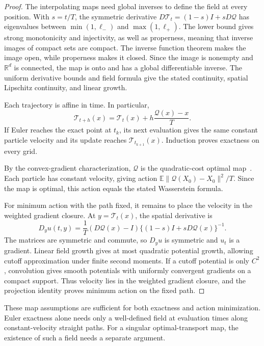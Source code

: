 \begin{proof}
The interpolating maps need global inverses to define the field at every position. With $s=t/T$, the symmetric derivative $D\mathcal T_t=(1-s)I+sD\mathcal Q$ has eigenvalues between $\min(1,\ell_-)$ and $\max(1,\ell_+)$. The lower bound gives strong monotonicity and injectivity, as well as properness, meaning that inverse images of compact sets are compact. The inverse function theorem makes the image open, while properness makes it closed. Since the image is nonempty and $\mathbb R^d$ is connected, the map is onto and has a global differentiable inverse. The uniform derivative bounds and field formula give the stated continuity, spatial Lipschitz continuity, and linear growth.

Each trajectory is affine in time. In particular,
\[
 \mathcal T_{t+h}(x)=\mathcal T_t(x)+h\frac{\mathcal Q(x)-x}{T}.
\]
If Euler reaches the exact point at $t_k$, its next evaluation gives the same constant particle velocity and its update reaches $\mathcal T_{t_{k+1}}(x)$. Induction proves exactness on every grid.

By the convex-gradient characterization, $\mathcal Q$ is the quadratic-cost optimal map~\citep[Section~6.2.3]{ambrosio2005gradient}. Each particle has constant velocity, giving action $\mathbb E\|\mathcal Q(X_0)-X_0\|^2/T$. Since the map is optimal, this action equals the stated Wasserstein formula.

For minimum action with the path fixed, it remains to place the velocity in the weighted gradient closure. At $y=\mathcal T_t(x)$, the spatial derivative is
\[
 D_yu(t,y)=\frac1T(D\mathcal Q(x)-I)
 \{(1-s)I+sD\mathcal Q(x)\}^{-1}.
\]
The matrices are symmetric and commute, so $D_yu$ is symmetric and $u_t$ is a gradient. Linear field growth gives at most quadratic potential growth, allowing cutoff approximation under finite second moments. If a cutoff potential is only $C^2$, convolution gives smooth potentials with uniformly convergent gradients on a compact support. Thus velocity lies in the weighted gradient closure, and the projection identity proves minimum action on the fixed path.
\end{proof}

These map assumptions are sufficient for both exactness and action minimization. Euler exactness alone needs only a well-defined field at evaluation times along constant-velocity straight paths. For a singular optimal-transport map, the existence of such a field needs a separate argument.

